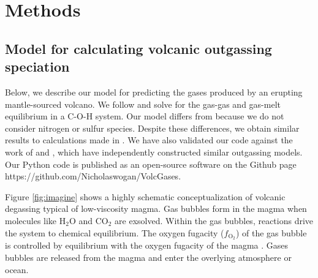 \section{Methods} \label{sec:methods}

\subsection{Model for calculating volcanic outgassing speciation} \label{sec:volcmodel}

Below, we describe our model for predicting the gases produced by an erupting mantle-sourced volcano. We follow \citet{Gaillard_2014} and solve for the gas-gas and gas-melt equilibrium in a C-O-H system. Our model differs from \citet{Gaillard_2014} because we do not consider nitrogen or sulfur species. Despite these differences, we obtain similar results to calculations made in \citet{Gaillard_2014}. We have also validated our code against the work of \citet{Liggins_2020} and \citet{Ortenzi_2020}, which have independently constructed similar outgassing models. Our Python code is published as an open-source software on the Github page https://github.com/Nicholaswogan/VolcGases. 

Figure \ref{fig:imagine} shows a highly schematic conceptualization of volcanic degassing typical of low-viscosity magma. Gas bubbles form in the magma when molecules like H$_2$O and CO$_2$ are exsolved. Within the gas bubbles, reactions drive the system to chemical equilibrium. The oxygen fugacity ($f_{\mathrm{O_2}}$) of the gas bubble is controlled by equilibrium with the oxygen fugacity of the magma \citep[e.g.][]{Kadoya_2020}. Gases bubbles are released from the magma and enter the overlying atmosphere or ocean.

